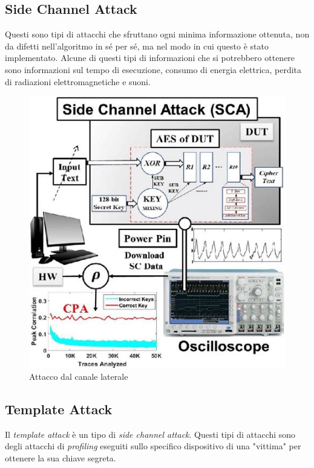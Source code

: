 

\subsection{Side Channel Attack}

\textsf{\small Questi sono tipi di attacchi che sfruttano ogni minima informazione ottenuta, non da difetti nell'algoritmo in sé per sé, ma nel modo in cui questo è stato implementato. Alcune di questi tipi di informazioni che si potrebbero ottenere sono informazioni sul tempo di esecuzione, consumo di energia elettrica, perdita di radiazioni elettromagnetiche e suoni.}

\begin{figure}[H]
	\centering
	\includegraphics[width=.6\textwidth, height=.6\textheight, keepaspectratio]{./images/attacks/side_channel_attack.png}
	\caption{Attacco dal canale laterale}
	\label{fig:side_channel_attack}
\end{figure}

\subsection{Template Attack}

\textsf{\small Il \emph{template attack} è un tipo di \emph{side channel attack}. Questi tipi di attacchi sono degli attacchi di \emph{profiling} eseguiti sullo specifico dispositivo di una "vittima" per ottenere la sua chiave segreta. }

